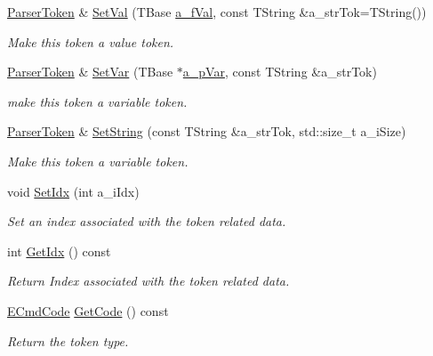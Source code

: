 \begin{DoxyCompactItemize}
\hyperlink{classmu_1_1_parser_token}{Parser\+Token} \& \hyperlink{classmu_1_1_parser_token_a68d4974b234ee9f109ef466cd04e1501}{Set\+Val} (T\+Base \hyperlink{mu_parser_d_l_l_8h_a8ed6c2f8e84831a06620ad0546609ae6}{a\+\_\+f\+Val}, const T\+String \&a\+\_\+str\+Tok=T\+String())
\begin{DoxyCompactList}\small\item\em Make this token a value token. \end{DoxyCompactList}\item 
\hyperlink{classmu_1_1_parser_token}{Parser\+Token} \& \hyperlink{classmu_1_1_parser_token_a86de84eb76900ca677c3ab93681ec7c5}{Set\+Var} (T\+Base $\ast$\hyperlink{mu_parser_d_l_l_8h_a3712e893ac2c28322464f6eebc1a0862}{a\+\_\+p\+Var}, const T\+String \&a\+\_\+str\+Tok)
\begin{DoxyCompactList}\small\item\em make this token a variable token. \end{DoxyCompactList}\item 
\hyperlink{classmu_1_1_parser_token}{Parser\+Token} \& \hyperlink{classmu_1_1_parser_token_ada40ff914f9c59f6891f6809991b3542}{Set\+String} (const T\+String \&a\+\_\+str\+Tok, std\+::size\+\_\+t a\+\_\+i\+Size)
\begin{DoxyCompactList}\small\item\em Make this token a variable token. \end{DoxyCompactList}\item 
void \hyperlink{classmu_1_1_parser_token_ac2e70ba039bc033722ea946342649881}{Set\+Idx} (int a\+\_\+i\+Idx)
\begin{DoxyCompactList}\small\item\em Set an index associated with the token related data. \end{DoxyCompactList}\item 
int \hyperlink{classmu_1_1_parser_token_a394d2f4c77548e20d6ea1d69ab583426}{Get\+Idx} () const 
\begin{DoxyCompactList}\small\item\em Return Index associated with the token related data. \end{DoxyCompactList}\item 
\hyperlink{namespacemu_ab77181e591bebd278bf9c7a2e30ad40e}{E\+Cmd\+Code} \hyperlink{classmu_1_1_parser_token_a2aed855c2686a1a4f7696f373e79d2ba}{Get\+Code} () const 
\begin{DoxyCompactList}\small\item\em Return the token type. \end{DoxyCompactList}\item 

\end{DoxyCompactItemize}
